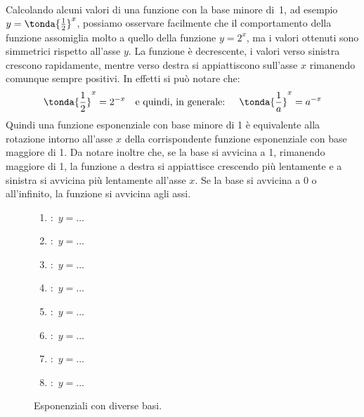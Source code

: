 \paragraph{}
Calcolando alcuni valori di una funzione con la base minore di~1, 
ad esempio \(y=\tonda{\frac{1}{2}}^x\), possiamo osservare facilmente che 
il 
comportamento della funzione assomiglia molto a quello della funzione
\(y=2^x\), ma i valori ottenuti sono simmetrici rispetto all'asse \(y\). 
La funzione è decrescente, i valori verso sinistra crescono rapidamente, 
mentre 
verso destra si appiattiscono sull'asse \(x\) rimanendo comunque sempre 
positivi. In effetti si può notare che:
\[\tonda{\frac{1}{2}}^x = 2^{-x} \quad \text{e quindi, in generale: }\quad 
\tonda{\frac{1}{a}}^x = a^{-x}\]
Quindi una funzione esponenziale con base minore di 1 è equivalente alla 
rotazione intorno all'asse \(x\) della
corrispondente funzione esponenziale con base maggiore di 1. Da notare 
inoltre che, se la base si avvicina
a 1, rimanendo maggiore di 1, la funzione a destra si 
appiattisce crescendo più lentamente e a sinistra si avvicina più 
lentamente all'asse \(x\). Se la base si avvicina a 0 o all'infinito, la 
funzione si avvicina agli assi.

\vspace{5pt}

\begin{figure}[h]
\begin{minipage}{.69\textwidth}
 \begin{inaccessibleblock}
  \espdiversebasi
\end{inaccessibleblock}
\end{minipage}
\hspace{12pt}
\begin{minipage}{.20\textwidth}
 \begin{enumerate} [label=\alph*]
   \item :~\(y=...\)
   \item :~\(y=...\)
   \item :~\(y=...\)
   \item :~\(y=...\)
   \item :~\(y=...\)
   \item :~\(y=...\)
   \item :~\(y=...\)
   \item :~\(y=...\)
 \end{enumerate}
\end{minipage}
  \caption{Esponenziali con diverse basi.} \label{fig:diversebasi}
\end{figure}

